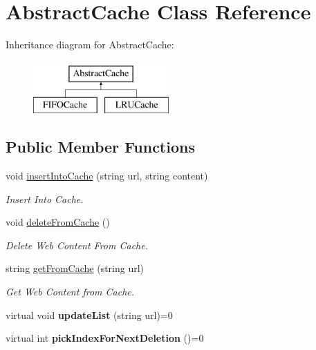 \hypertarget{classAbstractCache}{\section{\-Abstract\-Cache \-Class \-Reference}
\label{classAbstractCache}
}
\-Inheritance diagram for \-Abstract\-Cache\-:\begin{figure}[H]
\begin{center}
\leavevmode
\includegraphics[height=2.000000cm]{classAbstractCache}
\end{center}
\end{figure}
\subsection*{\-Public \-Member \-Functions}
\begin{DoxyCompactItemize}
\item 
void \hyperlink{classAbstractCache_adcfda4aa5503e9ea60d2bc5575c04cd3}{insert\-Into\-Cache} (string url, string content)
\begin{DoxyCompactList}\small\item\em \-Insert \-Into \-Cache. \end{DoxyCompactList}\item 
void \hyperlink{classAbstractCache_a7cba328082bcd2f8a02e52546b9dd244}{delete\-From\-Cache} ()
\begin{DoxyCompactList}\small\item\em \-Delete \-Web \-Content \-From \-Cache. \end{DoxyCompactList}\item 
string \hyperlink{classAbstractCache_a9b49b5835bbe2fa878bac959ebbec925}{get\-From\-Cache} (string url)
\begin{DoxyCompactList}\small\item\em \-Get \-Web \-Content from \-Cache. \end{DoxyCompactList}\item 
\hypertarget{classAbstractCache_a67552fbca85ce7dbc7e2c553b1036884}{virtual void {\bfseries update\-List} (string url)=0}\label{classAbstractCache_a67552fbca85ce7dbc7e2c553b1036884}

\item 
\hypertarget{classAbstractCache_ae9fe168b0b9167c27b94b4a3a1be788c}{virtual int {\bfseries pick\-Index\-For\-Next\-Deletion} ()=0}\label{classAbstractCache_ae9fe168b0b9167c27b94b4a3a1be788c}

\end{DoxyCompactItemize}
